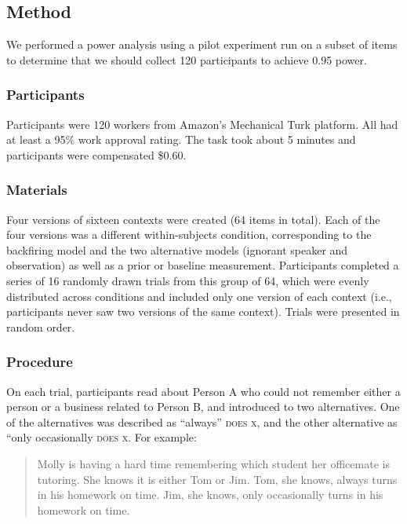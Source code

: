 \documentclass[10pt,letterpaper]{article}
\begin{document}

\subsection{Method}

We performed a power analysis using a pilot experiment run on a subset of items to determine that we should collect 120 participants to achieve 0.95 power. 

\subsubsection{Participants}

Participants were 120 workers from Amazon's Mechanical Turk platform. 
All had at least a 95\% work approval rating.
The task took about 5 minutes and participants were compensated \$0.60.

\subsubsection{Materials}

Four versions of sixteen contexts were created (64 items in total). 
Each of the four versions was a different within-subjects condition, corresponding to the backfiring model and the two alternative models (ignorant speaker and observation) as well as a prior or baseline measurement. 
Participants completed a series of 16 randomly drawn trials from this group of 64, which were evenly distributed across conditions and included only one version of each context (i.e., participants never saw two versions of the same context).  
Trials were presented in random order.

\subsubsection{Procedure}

On each trial, participants read about Person A who could not remember either a person or a business related to Person B, and introduced to two alternatives. 
One of the alternatives was described as ``always'' \textsc{does x}, and the other alternative as ``only occasionally \textsc{does x}. 
For example:
\begin{quote}
Molly is having a hard time remembering which student her officemate is tutoring.  
She knows it is either Tom or Jim. 
Tom, she knows, always turns in his homework on time.  
Jim, she knows, only occasionally turns in his homework on time.
\end{quote}
\end{document}

